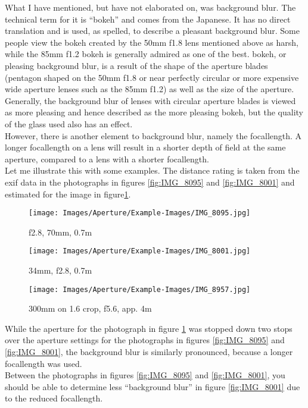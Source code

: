 What I have mentioned, but have not elaborated on, was background blur. The technical term for it is ``\gls{bokeh}'' and comes from the Japanese. It has no direct translation and is used, as spelled, to describe a pleasant background blur. Some people view the \gls{bokeh} created by the 50mm f1.8 lens mentioned above as harsh, while the 85mm f1.2 bokeh is generally admired as one of the best. \Gls{bokeh}, or pleasing background blur, is a result of the shape of the aperture blades (pentagon shaped on the 50mm f1.8 or near perfectly circular or more expensive wide aperture lenses such as the 85mm f1.2) as well as the size of the \gls{aperture}.
\\
Generally, the background blur of lenses with circular aperture blades is viewed as more pleasing and hence described as the more pleasing \gls{bokeh}, but the quality of the glass used also has an effect.
\\[\baselineskip]
However, there is another element to background blur, namely the \gls{focallength}. A longer \gls{focallength} on a lens will result in a shorter depth of field at the same \gls{aperture}, compared to a lens with a shorter \gls{focallength}.
\\
Let me illustrate this with some examples. The distance rating is taken from the exif data in the photographs in figures \ref{fig:IMG_8095} and \ref{fig:IMG_8001} and estimated for the image in figure\ref{fig:IMG_8957}.

\begin{figure}[htbp]
\begin{minipage}{.35\textwidth}
	\centering
		\texttt{[image: Images/Aperture/Example-Images/IMG\_8095.jpg]}
	\caption{f2.8, 70mm, 0.7m}
	\label{fig:IMG_8095}
\end{minipage}
\begin{minipage}{.28\textwidth}
\centering
		\texttt{[image: Images/Aperture/Example-Images/IMG\_8001.jpg]}
	\caption{34mm, f2.8, 0.7m}
	\label{fig:IMG_8001}
\end{minipage}
\begin{minipage}{.35\textwidth}
	\centering
		\texttt{[image: Images/Aperture/Example-Images/IMG\_8957.jpg]}
	\caption{300mm on 1.6 crop, f5.6, app. 4m}
	\label{fig:IMG_8957}
\end{minipage}
\end{figure}

While the \gls{aperture} for the photograph in figure \ref{fig:IMG_8957} was stopped down two \glspl{stop} over the \gls{aperture} settings for the photographs in figures \ref{fig:IMG_8095} and \ref{fig:IMG_8001}, the background blur is similarly pronounced, because a longer \gls{focallength} was used.
\\
Between the photographs in figures \ref{fig:IMG_8095} and \ref{fig:IMG_8001}, you should be able to determine less ``background blur'' in figure \ref{fig:IMG_8001} due to the reduced \gls{focallength}.

